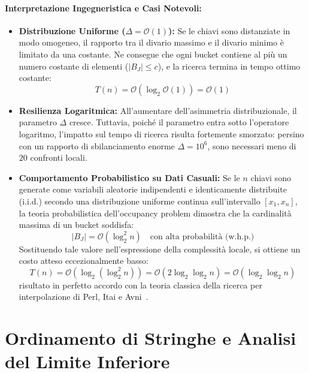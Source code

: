 \paragraph{Interpretazione Ingegneristica e Casi Notevoli:}
\begin{itemize}
  \item \textbf{Distribuzione Uniforme ($\Delta = \mathcal{O}(1)$):} Se le chiavi sono distanziate in modo omogeneo, il rapporto tra il divario massimo e il divario minimo \`e limitato da una costante. Ne consegue che ogni bucket contiene al pi\`u un numero costante di elementi ($|B_J| \le c$), e la ricerca termina in tempo ottimo costante:
  \begin{equation}
    T(n) = \mathcal{O}(\log_2 \mathcal{O}(1)) = \mathcal{O}(1)
  \end{equation}
  \item \textbf{Resilienza Logaritmica:} All'aumentare dell'asimmetria distribuzionale, il parametro $\Delta$ cresce. Tuttavia, poich\'e il parametro entra sotto l'operatore logaritmo, l'impatto sul tempo di ricerca risulta fortemente smorzato: persino con un rapporto di sbilanciamento enorme $\Delta = 10^6$, sono necessari meno di $20$ confronti locali.
  \item \textbf{Comportamento Probabilistico su Dati Casuali:} Se le $n$ chiavi sono generate come variabili aleatorie indipendenti e identicamente distribuite (i.i.d.) secondo una distribuzione uniforme continua sull'intervallo $[x_1, x_n]$, la teoria probabilistica dell'occupancy problem dimostra che la cardinalit\`a massima di un bucket soddisfa:
  \begin{equation}
    |B_J| = \mathcal{O}\left( \log_2^2 n \right) \quad \text{con alta probabilit\`a (w.h.p.)}
  \end{equation}
  Sostituendo tale valore nell'espressione della complessit\`a locale, si ottiene un costo atteso eccezionalmente basso:
  \begin{equation}
    T(n) = \mathcal{O}\left( \log_2 \left( \log_2^2 n \right) \right) = \mathcal{O}\left( 2 \log_2 \log_2 n \right) = \mathcal{O}(\log_2 \log_2 n)
  \end{equation}
  risultato in perfetto accordo con la teoria classica della ricerca per interpolazione di Perl, Itai e Avni~\cite{perl1978}.
\end{itemize}

\FloatBarrier
\section{Ordinamento di Stringhe e Analisi del Limite Inferiore}
\label{sec:string-sorting-lower-bound}

